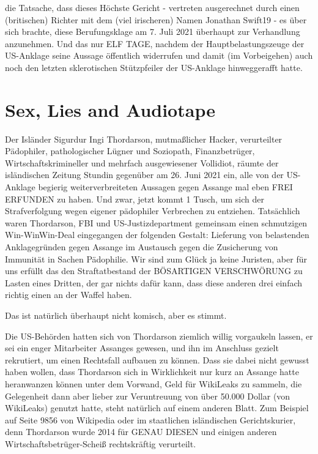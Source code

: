 \begin{multicols}{2}
die Tatsache, dass dieses Höchste Gericht - vertreten
ausgerechnet durch einen (britischen) Richter mit dem
(viel irischeren) Namen Jonathan Swift19 - es über sich
brachte, diese Berufungsklage am 7. Juli 2021 überhaupt
zur Verhandlung anzunehmen. Und das nur ELF TAGE,
nachdem der Hauptbelastungszeuge der US-Anklage
seine Aussage öffentlich widerrufen und damit (im Vorbeigehen) auch noch den letzten sklerotischen Stützpfeiler der US-Anklage hinweggerafft hatte.



\chapter{Sex, Lies and Audiotape} %

Der Isländer Sigurdur Ingi Thordarson, mutmaßlicher
Hacker, verurteilter Pädophiler, pathologischer Lügner
und Soziopath, Finanzbetrüger, Wirtschaftskrimineller
und mehrfach ausgewiesener Vollidiot, räumte der isländischen Zeitung Stundin gegenüber am 26. Juni 2021
ein, alle von der US-Anklage begierig weiterverbreiteten
Aussagen gegen Assange mal eben FREI ERFUNDEN
zu haben. Und zwar, jetzt kommt 1 Tusch, um sich der
Strafverfolgung wegen eigener pädophiler Verbrechen
zu entziehen.
Tatsächlich waren Thordarson, FBI und US-Justizdepartment gemeinsam einen schmutzigen Win-WinWin-Deal eingegangen der folgenden Gestalt: Lieferung
von belastenden Anklagegründen gegen Assange im
Austausch gegen die Zusicherung von Immunität in Sachen Pädophilie. Wir sind zum Glück ja keine Juristen,
aber für uns erfüllt das den Straftatbestand der BÖSARTIGEN VERSCHWÖRUNG zu Lasten eines Dritten, der
gar nichts dafür kann, dass diese anderen drei einfach
richtig einen an der Waffel haben.

Das ist natürlich überhaupt nicht komisch, aber es
stimmt.

Die US-Behörden hatten sich von Thordarson ziemlich
willig vorgaukeln lassen, er sei ein enger Mitarbeiter Assanges gewesen, und ihn im Anschluss gezielt rekrutiert,
um einen Rechtsfall aufbauen zu können. Dass sie dabei nicht gewusst haben wollen, dass Thordarson sich
in Wirklichkeit nur kurz an Assange hatte heranwanzen
können unter dem Vorwand, Geld für WikiLeaks zu sammeln, die Gelegenheit dann aber lieber zur Veruntreuung von über 50.000 Dollar (von WikiLeaks) genutzt hatte, steht natürlich auf einem anderen Blatt. Zum Beispiel
auf Seite 9856 von Wikipedia oder im staatlichen isländischen Gerichtskurier, denn Thordarson wurde 2014 für
GENAU DIESEN und einigen anderen Wirtschaftsbetrüger-Scheiß rechtskräftig verurteilt.


\end{multicols}

